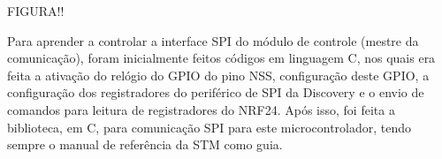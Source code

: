 FIGURA!!

Para aprender a controlar a interface SPI do módulo de controle (mestre da comunicação), foram inicialmente feitos códigos em linguagem C, nos quais era feita a ativação do relógio do GPIO do pino NSS, configuração deste GPIO, a configuração dos registradores do periférico de SPI da Discovery e o envio de comandos para leitura de registradores do NRF24.
Após isso, foi feita a biblioteca, em C, para comunicação SPI para este microcontrolador, tendo sempre o manual de referência da STM como guia.


